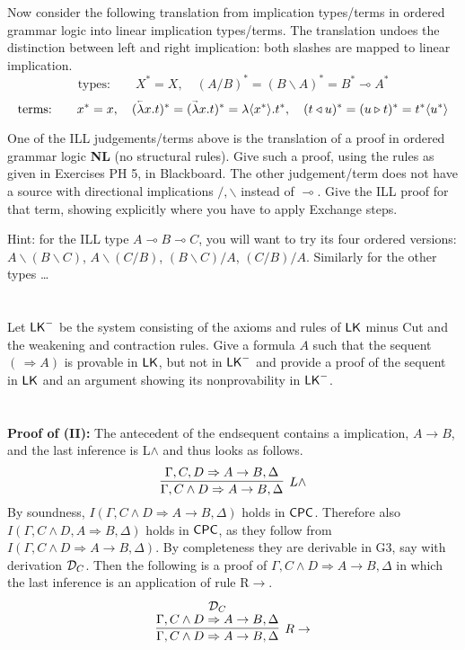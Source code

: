 \documentclass[11pt]{article}
\newcommand{\cpc}{{\sf CPC}}
\newcommand{\Gth}{{\sf G3}}
\newcommand{\LK}{{\sf LK}}
\newcommand{\cald}{{\cal D}}
\newcommand{\Ga}{\Gamma}
\newcommand{\De}{\Delta}
\newcommand{\imp}{\rightarrow}
\newcommand{\en}{\wedge}
\newcommand{\seq}{\Rightarrow}
\newcommand{\Zip}[1]{\langle #1 \rangle}
\newcommand{\lolli}{\multimap}
\newcommand{\bs}{\backslash}
\newcommand{\W}[1]{\textrm{#1}}
\newcommand\rlambda{\overset{{}_{\shortrightarrow}}{\lambda}}
\newcommand\llambda{\overset{{}_{\shortleftarrow}}{\lambda}}
\begin{document}
Now consider the following translation from implication types/terms in
ordered grammar logic into linear implication types/terms.
The translation undoes the distinction between left and right implication:
both slashes are mapped to linear implication.
\[\W{types:}\qquad X^{*}=X,\quad (A/B)^{*} = (B\bs A)^{*} = B^{*}\lolli A^{*}\]
\[\W{terms:}\qquad
x^{*}=x,\quad (\llambda x.t)^{*}=(\rlambda x.t)^{*}=\lambda\Zip{x^{*}}.t^{*},\quad
(t\triangleleft u)^{*}=(u\triangleright t)^{*} = t^{*}\Zip{u^{*}}\]

One of the ILL judgements/terms above is the translation of a proof in ordered grammar logic \textbf{NL}
(no structural rules).
Give such a proof, using the rules as given in Exercises PH 5, in Blackboard. The other judgement/term does not
have a source with directional implications $\slash, \bs$ instead of $\lolli$.
Give the ILL proof for that term, showing explicitly where you have to
apply Exchange steps.

Hint: for the ILL type $A\lolli B\lolli C$, you will want to try its four ordered versions:
$A\bs(B\bs C)$, $A\bs(C/B)$, $(B\bs C)/A$, $(C/B)/A$. Similarly for the other types \ldots



\section{}

Let $\LK^-$ be the system consisting of the axioms and rules of $\LK$ minus Cut and the weakening and contraction rules. Give a formula $A$ such that the sequent $(\,\seq A)$ is provable in $\LK$, but not in $\LK^-$ and provide a  proof of the sequent in  $\LK$ and an argument showing its  nonprovability in $\LK^-$. 


\section{}


{\bf Proof of (II):}
The antecedent of the endsequent contains a implication, $A \imp B$, and the last inference is L$\en$ and thus looks as follows. 
\[
 \infer[L \en]{\Ga, C\en D \seq A \imp B,\De}{\Ga,C,D \seq A\imp B, \De} 
\]
By soundness, $I(\Ga, C\en D \seq A \imp B,\De)$ holds in $\cpc$. Therefore also 
$I(\Ga ,C \en D ,A \seq B, \De)$ holds in $\cpc$, as they follow from $I(\Ga, C\en D \seq A \imp B,\De)$. By completeness they are derivable in \Gth, say with derivation $\cald_C$. Then the following is a proof of $\Ga, C\en D \seq A \imp B,\De$ in which the last inference is an application of rule R$\imp$. 
\[
 \infer[R \imp]{\Ga, C\en D \seq A \imp B,\De}{\deduce[\cald_C]
 {\Ga, C\en D \seq A \imp B,\De}{} }
\]
 
\end{document}
